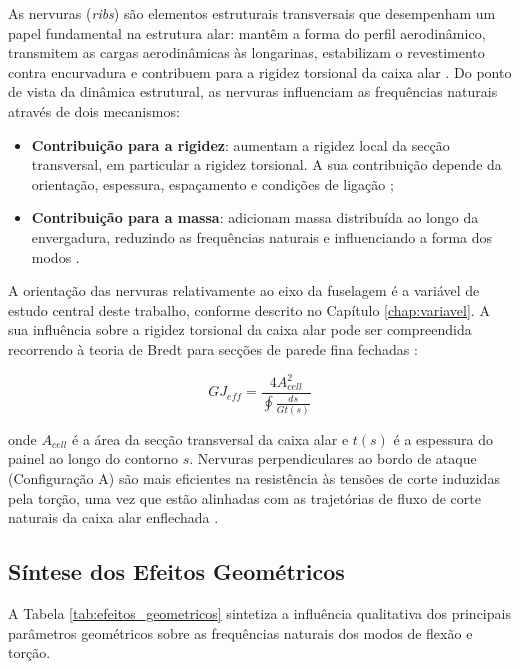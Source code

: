 \documentclass[11pt,oneside,a4paper,final]{report}
\begin{document}
As nervuras (\textit{ribs}) são elementos estruturais transversais que desempenham um papel fundamental na estrutura alar: mantêm a forma do perfil aerodinâmico, transmitem as cargas aerodinâmicas às longarinas, estabilizam o revestimento contra encurvadura e contribuem para a rigidez torsional da caixa alar \cite{Megson2012, Niu1988}. Do ponto de vista da dinâmica estrutural, as nervuras influenciam as frequências naturais através de dois mecanismos:

\begin{itemize}
    \item \textbf{Contribuição para a rigidez}: aumentam a rigidez local da secção transversal, em particular a rigidez torsional. A sua contribuição depende da orientação, espessura, espaçamento e condições de ligação \cite{Niu1988};

    \item \textbf{Contribuição para a massa}: adicionam massa distribuída ao longo da envergadura, reduzindo as frequências naturais e influenciando a forma dos modos \cite{Craig2006}.
\end{itemize}

A orientação das nervuras relativamente ao eixo da fuselagem é a variável de estudo central deste trabalho, conforme descrito no Capítulo \ref{chap:variavel}. A sua influência sobre a rigidez torsional da caixa alar pode ser compreendida recorrendo à teoria de Bredt para secções de parede fina fechadas \cite{Megson2012}:

\begin{equation}
    GJ_{eff} = \frac{4A_{cell}^2}{\oint \frac{ds}{Gt(s)}}
    \label{eq:bredt}
\end{equation}

\noindent onde $A_{cell}$ é a área da secção transversal da caixa alar e $t(s)$ é a espessura do painel ao longo do contorno $s$. Nervuras perpendiculares ao bordo de ataque (Configuração A) são mais eficientes na resistência às tensões de corte induzidas pela torção, uma vez que estão alinhadas com as trajetórias de fluxo de corte naturais da caixa alar enflechada \cite{Niu1988, Megson2012}.

\subsection{Síntese dos Efeitos Geométricos}

A Tabela \ref{tab:efeitos_geometricos} sintetiza a influência qualitativa dos principais parâmetros geométricos sobre as frequências naturais dos modos de flexão e torção.
\end{document}
